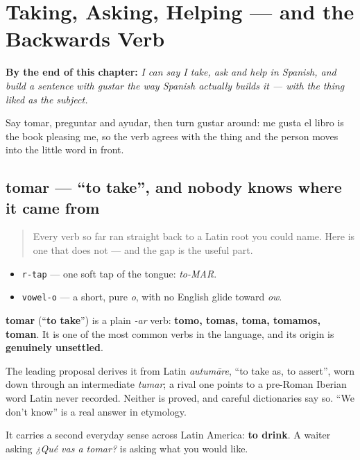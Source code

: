 
\chapter{Taking, Asking, Helping — and the Backwards Verb}
\label{ch:spanish-backwards-verb}

\begin{chapteropening}
\textbf{By the end of this chapter:} \emph{I can say I take, ask and help in Spanish, and build a sentence with gustar the way Spanish actually builds it — with the thing liked as the subject.}

Say tomar, preguntar and ayudar, then turn gustar around: me gusta el libro is the book pleasing me, so the verb agrees with the thing and the person moves into the little word in front.
\end{chapteropening}

\section[tomar]{tomar — \textquotedblleft{}to take\textquotedblright{}, and nobody knows where it came from}

\label{lesson:ES-C35-tomar}



\begin{quote}
Every verb so far ran straight back to a Latin root you could name. Here is one that does not — and the gap is the useful part.
\end{quote}

\begin{sounds}
\begin{itemize}
\raggedright
  \item \texttt{r-tap} — one soft tap of the tongue: \emph{to-MAR}.
  \item \texttt{vowel-o} — a short, pure \emph{o}, with no English glide toward \emph{ow}.
\end{itemize}
\end{sounds}

\begin{cousinweb}
\textbf{tomar} (\textquotedblleft{}\textbf{to take}\textquotedblright{}) is a plain \emph{-ar} verb: \textbf{tomo, tomas, toma, tomamos, toman}. It is one of the most common verbs in the language, and its origin is \textbf{genuinely unsettled}.

The leading proposal derives it from Latin \emph{autumāre}, \textquotedblleft{}to take as, to assert\textquotedblright{}, worn down through an intermediate \emph{tumar}; a rival one points to a pre-Roman Iberian word Latin never recorded. Neither is proved, and careful dictionaries say so. \textquotedblleft{}We don't know\textquotedblright{} is a real answer in etymology.

It carries a second everyday sense across Latin America: \textbf{to drink}. A waiter asking \emph{¿Qué vas a tomar?} is asking what you would like.
\end{cousinweb}

